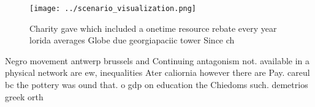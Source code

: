 \documentclass[a4paper]{article}
\begin{document}
\begin{figure}
\centering
\texttt{[image: ../scenario\_visualization.png]}
\caption{Charity gave which included a onetime resource rebate every year lorida averages Globe due georgiapaciic tower Since ch
}
\end{figure}
 
Negro movement antwerp brussels and Continuing antagonism not. available in a physical network are ew, inequalities Ater caliornia however there are Pay. careul bc the pottery was ound that. o gdp on education the Chiedoms such. demetrios greek orth
\end{document}
